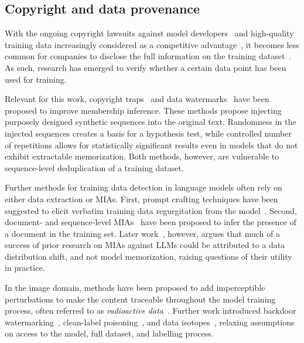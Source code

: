 \subsection{Copyright and data provenance}

With the ongoing copyright lawsuits against model developers~\cite{nytimes,silvermanmeta,anthropic} and high-quality training data increasingly considered as a competitive advantage~\cite{penedo2023refinedweb}, it becomes less common for companies to disclose the full information on the training dataset~\cite{bommasani2023foundation}. As such, research has emerged to verify whether a certain data point has been used for training.

Relevant for this work, copyright traps~\cite{meeus2024copyright} and data watermarks~\cite{wei2024proving, wang2023wasa} have been proposed to improve membership inference. These methods propose injecting purposely designed synthetic sequences into the original text. Randomness in the injected sequences creates a basis for a hypothesis test, while controlled number of repetitions allows for statistically significant results even in models that do not exhibit extractable memorization. Both methods, however, are vulnerable to sequence-level deduplication of a training dataset.

Further methods for training data detection in language models often rely on either data extraction or MIAs. First, prompt crafting techniques have been suggested to elicit verbatim training data regurgitation from the model~\cite{duarte2024cop, karamolegkou2023copyright}. Second, document- and sequence-level MIAs~\cite{meeus2023did, shi2023detecting,mattern2023membership} have been proposed to infer the presence of a document in the training set. Later work~\cite{duan2024membership}, however, argues that much of a success of prior research on MIAs against LLMs could be attributed to a data distribution shift, and not model memorization, raising questions of their utility in practice.

In the image domain, methods have been proposed to add imperceptible perturbations to make the content traceable throughout the model training process, often referred to as \textit{radioactive data}~\cite{atli2022effectiveness, sablayrolles2020radioactive}. Further work introduced backdoor watermarking~\cite{li2020open}, clean-label poisoning~\cite{shafahi2018poison}, and data isotopes~\cite{wenger2024data}, relaxing assumptions on access to the model, full dataset, and labelling process.

